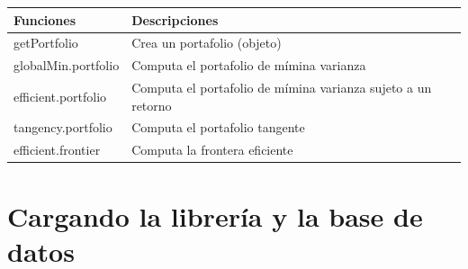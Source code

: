 \documentclass[12pt,]{book}
\begin{document}
\begin{longtable}[]{@{}ll@{}}
\toprule
\begin{minipage}[b]{0.24\columnwidth}\raggedright\strut
Funciones\strut
\end{minipage} & \begin{minipage}[b]{0.70\columnwidth}\raggedright\strut
Descripciones\strut
\end{minipage}\tabularnewline
\midrule
\endhead
\begin{minipage}[t]{0.24\columnwidth}\raggedright\strut
getPortfolio\strut
\end{minipage} & \begin{minipage}[t]{0.70\columnwidth}\raggedright\strut
Crea un portafolio (objeto)\strut
\end{minipage}\tabularnewline
\begin{minipage}[t]{0.24\columnwidth}\raggedright\strut
globalMin.portfolio\strut
\end{minipage} & \begin{minipage}[t]{0.70\columnwidth}\raggedright\strut
Computa el portafolio de mímina varianza\strut
\end{minipage}\tabularnewline
\begin{minipage}[t]{0.24\columnwidth}\raggedright\strut
efficient.portfolio\strut
\end{minipage} & \begin{minipage}[t]{0.70\columnwidth}\raggedright\strut
Computa el portafolio de mímina varianza sujeto a un retorno\strut
\end{minipage}\tabularnewline
\begin{minipage}[t]{0.24\columnwidth}\raggedright\strut
tangency.portfolio\strut
\end{minipage} & \begin{minipage}[t]{0.70\columnwidth}\raggedright\strut
Computa el portafolio tangente\strut
\end{minipage}\tabularnewline
\begin{minipage}[t]{0.24\columnwidth}\raggedright\strut
efficient.frontier\strut
\end{minipage} & \begin{minipage}[t]{0.70\columnwidth}\raggedright\strut
Computa la frontera eficiente\strut
\end{minipage}\tabularnewline
\bottomrule
\end{longtable}

\section{Cargando la librería y la base de
datos}\label{cargando-la-libreria-y-la-base-de-datos}
\end{document}
